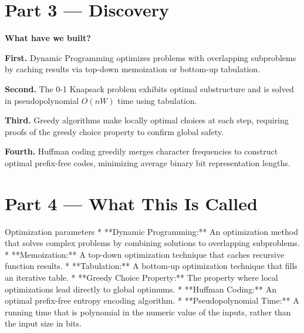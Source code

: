\documentclass[12pt, a4paper]{book}
\begin{document}
\newpage

\section{Part 3 --- Discovery}

\begin{discoverybox}
\textbf{What have we built?}

\textbf{First.} Dynamic Programming optimizes problems with overlapping subproblems by caching results via top-down memoization or bottom-up tabulation.

\textbf{Second.} The 0-1 Knapsack problem exhibits optimal substructure and is solved in pseudopolynomial $O(n W)$ time using tabulation.

\textbf{Third.} Greedy algorithms make locally optimal choices at each step, requiring proofs of the greedy choice property to confirm global safety.

\textbf{Fourth.} Huffman coding greedily merges character frequencies to construct optimal prefix-free codes, minimizing average binary bit representation lengths.
\end{discoverybox}

\newpage

\section{Part 4 --- What This Is Called}

\begin{namedconcept}{Optimization parameters}
* **Dynamic Programming:** An optimization method that solves complex problems by combining solutions to overlapping subproblems.
* **Memoization:** A top-down optimization technique that caches recursive function results.
* **Tabulation:** A bottom-up optimization technique that fills an iterative table.
* **Greedy Choice Property:** The property where local optimizations lead directly to global optimums.
* **Huffman Coding:** An optimal prefix-free entropy encoding algorithm.
* **Pseudopolynomial Time:** A running time that is polynomial in the numeric value of the inputs, rather than the input size in bits.
\end{namedconcept}

\newpage

\end{document}
